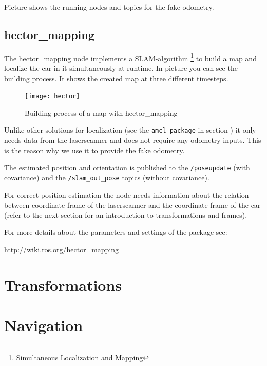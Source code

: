 {Picture  shows the running nodes and topics for the fake odometry.

\subsection{hector\_mapping}
\label{sec:tas_package_odom_hector}

The hector\_mapping node implements a SLAM-algorithm \footnote{Simultaneous Localization and Mapping} to build a map and localize the car in it simultaneously at runtime. In picture  you can see the building process. It shows the created map at three different timesteps.

\begin{figure}[h]
	\centering
		\texttt{[image: hector]}
	\caption{Building process of a map with hector\_mapping}
	\label{fig:hector_buidling_process}
\end{figure}

Unlike other solutions for localization (see the \texttt{amcl package} in section ) it only needs data from the laserscanner and does not require any odometry inputs. This is the reason why we use it to provide the fake odometry.

The estimated position and orientation is published to the \texttt{/poseupdate} (with covariance) and the \texttt{/slam\_out\_pose} topics (without covariance). 
 
For correct position estimation the node needs information about the relation between coordinate frame of the laserscanner and the coordinate frame of the car (refer to the next section  for an introduction to transformations and frames). 

For more details about the parameters and settings of the package see:

\hyperref[http://wiki.ros.org/hector_mapping]{http://wiki.ros.org/hector\_mapping}

\section{Transformations}
\label{sec:tas_package_transformations}

\newpage
\section{Navigation}
\label{sec:tas_package_navigation}

}
